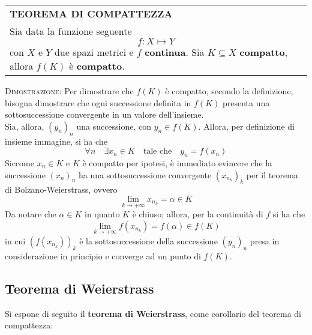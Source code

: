 \documentclass[a4paper]{extarticle}
\renewcommand\arraystretch{}
\begin{document}
\vspace{1em}
\setlength{\tabcolsep}{14pt}
\renewcommand{\arraystretch}{2}
\noindent
\begin{tabularx}{\textwidth}{@{}|P|@{}}
    \hline
    {\textbf{TEOREMA DI COMPATTEZZA}}\\
    \parbox{\linewidth}{Sia data la funzione seguente
    \[f : X \longmapsto Y\]
    con $X$ e $Y$ due spazi metrici e $f$ \textbf{continua}. Sia $K \subseteq X$ \textbf{compatto}, allora $f(K)$ è \textbf{compatto}.\vspace{3mm}}\\
    \hline
\end{tabularx}

\vspace{2em}
\noindent
\normalfont \normalsize
\textsc{Dimostrazione}: Per dimostrare che $f(K)$ è compatto, secondo la definizione, bisogna dimostrare che ogni successione definita in $f(K)$ presenta una sottosuccessione convergente in un valore dell'insieme.\\
Sia, allora, $(y_n)_n$ una successione, con $y_n \in f(K)$. Allora, per definizione di insieme immagine, si ha che
\[\forall n \hspace{1em} \exists x_n \in K \hspace{1em} \text{tale che} \hspace{1em} y_n=f(x_n)\]
Siccome $x_n \in K$ e $K$ è compatto per ipotesi, è immediato evincere che la successione $(x_n)_n$ ha una sottosuccessione convergente $(x_{n_k})_k$ per il teorema di Bolzano-Weierstrass, ovvero
\[\lim_{k \to +\infty} x_{n_k} = \alpha \in K\]
Da notare che $\alpha \in K$ in quanto $K$ è chiuso; allora, per la continuità di $f$ si ha che
\[\lim_{k \to +\infty} f(x_{n_k}) = f(\alpha) \in f(K)\]
in cui $\left(f(x_{n_k})\right)_k$ è la sottosuccessione della successione $(y_n)_n$ presa in considerazione in principio e converge ad un punto di $f(K)$.

\vspace{1em}
\noindent
\subsection{Teorema di Weierstrass}
Si espone di seguito il \textbf{teorema di Weierstrass}, come corollario del teorema di compattezza:
\end{document}
